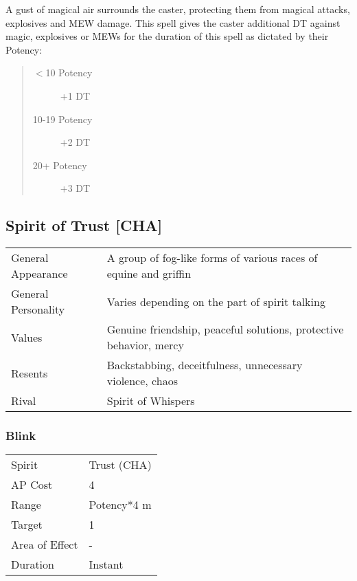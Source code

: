 \documentclass[11pt,a4paper,twocolumn]{book}
\begin{document}
A gust of magical air surrounds the caster, protecting them from magical attacks, explosives and MEW damage. This spell gives the caster additional DT against magic, explosives or MEWs for the duration of this spell as dictated by their Potency:

\begin{quote}
	\begin{description}
		\item[$<$10 Potency] 	+1 DT
		\item[10-19 Potency] 	+2 DT
		\item[20+ Potency] 		+3 DT
	\end{description}	
\end{quote}



\subsection*{Spirit of Trust [CHA]}
{
	\begin{tabu} to 75mm{| X[l,4] | X[l,8] |}
		\hline
		General Appearance  & A group of fog-like forms of various races of equine and griffin   \\
		General Personality & Varies depending on the part of spirit talking                     \\
		Values              & Genuine friendship, peaceful solutions, protective behavior, mercy \\
		Resents             & Backstabbing, deceitfulness, unnecessary violence, chaos           \\
		Rival               & Spirit of Whispers                                                 \\ \hline
	\end{tabu}
	
}

\medskip

\subsubsection*{Blink}

{
	\begin{tabu} to 70mm{| X[l,4] | X[l,7] |}
		\hline
		Spirit         & Trust (CHA)        \\
		AP Cost        & 4                  \\
		Range          & Potency*4 m \\
		Target         & 1                  \\
		Area of Effect & -                  \\
		Duration       & Instant            \\ \hline
	\end{tabu}
	
}
\smallskip
\end{document}
